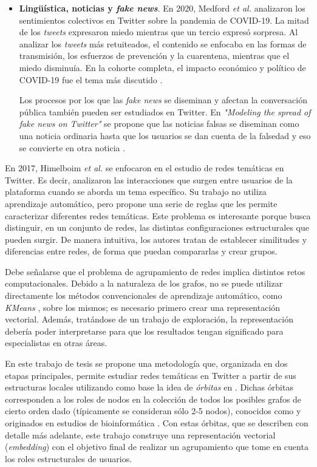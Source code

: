 \begin{itemize}
    \item \textbf{Lingüística, noticias y \textit{fake news}}. En 2020, Medford \textit{et al.} analizaron los sentimientos colectivos en Twitter sobre la pandemia de COVID-19. La mitad de los \textit{tweets} expresaron miedo mientras que un tercio expresó sorpresa. Al analizar los \textit{tweets} más retuiteados, el contenido se enfocaba en las formas de transmisión, los esfuerzos de prevención y la cuarentena, mientras que el miedo disminuía. En la cohorte completa, el impacto económico y político de COVID-19 fue el tema más discutido \cite{medford_infodemic_2020}. 

    Los procesos por los que las \textit{fake news} se diseminan y afectan la conversación pública también pueden ser estudiados en Twitter. En \textit{"Modeling the spread of fake news on Twitter"} se propone que las noticias falsas se diseminan como una noticia ordinaria hasta que los usuarios se dan cuenta de la falsedad y eso se convierte en otra noticia \cite{murayama_modeling_2021}.

\end{itemize}

En 2017, Himelboim \textit{et al.} \cite{himelboim_classifying_2017} se enfocaron en el estudio de redes temáticas en Twitter. Es decir, analizaron las interacciones que surgen entre usuarios de la plataforma cuando se aborda un tema específico. Su trabajo no utiliza aprendizaje automático, pero propone una serie de reglas que les permite caracterizar diferentes redes temáticas. Este problema es interesante porque busca distinguir, en un conjunto de redes, las distintas configuraciones estructurales que pueden surgir. De manera intuitiva, los autores tratan de establecer similitudes y diferencias entre redes, de forma que puedan compararlas y crear grupos. 

Debe señalarse que el problema de agrupamiento de redes implica distintos retos computacionales. Debido a la naturaleza de los grafos, no se puede utilizar directamente los métodos convencionales de aprendizaje automático, como \textit{KMeans} \cite{bejar_k-means_nodate}, sobre los mismos; es necesario primero crear una representación vectorial. Además, tratándose de un trabajo de exploración, la representación debería poder interpretarse para que los resultados tengan significado para especialistas en otras áreas. 

En este trabajo de tesis se propone una metodología que, organizada en dos etapas principales, permite estudiar redes temáticas en Twitter a partir de sus estructuras locales utilizando como base la idea de \textit{órbitas} \cite{sarajlic_graphlet-based_2016} en {\emph \graphlets}. Dichas órbitas corresponden a los roles de nodos en la colección de todos los posibles grafos de cierto orden dado (típicamente se consideran sólo 2-5 nodos), conocidos como \graphlets y originados en estudios de bioinformática \cite{przulj_biological_2007}. Con estas órbitas, que se describen con detalle más adelante, este trabajo construye una representación vectorial (\textit{embedding}) con el objetivo final de realizar un agrupamiento que tome en cuenta los roles estructurales de usuarios.

